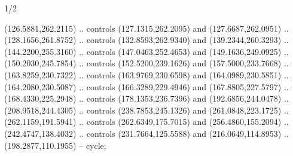\begin{flagdescription}{1/2}
\begin{scope}[y=-\flagwidth/600, x=\flagwidth/600,shift={(0,-600)}]
\begin{scope}[cm={{0.79146,0.0,0.0,0.78939,(-6.93659,3.01275)}}]
  (126.5881,262.2115) .. controls (127.1315,262.2095) and (127.6687,262.0951) ..
  (128.1656,261.8752) .. controls (132.8593,262.9340) and (139.2344,260.3293) ..
  (144.2200,255.3160) .. controls (147.0463,252.4653) and (149.1636,249.0925) ..
  (150.2030,245.7854) .. controls (152.5200,239.1626) and (157.5000,233.7668) ..
  (163.8259,230.7322) .. controls (163.9769,230.6598) and (164.0989,230.5851) ..
  (164.2080,230.5087) .. controls (166.3289,229.4946) and (167.8805,227.5797) ..
  (168.4330,225.2948) .. controls (178.1353,236.7396) and (192.6856,244.0478) ..
  (208.9518,244.4305) .. controls (238.7853,245.1326) and (261.0848,223.1725) ..
  (262.1159,191.5941) .. controls (262.6349,175.7015) and (256.4860,155.2094) ..
  (242.4747,138.4032) .. controls (231.7664,125.5588) and (216.0649,114.8953) ..
  (198.2877,110.1955) -- cycle;
\end{scope}
\end{scope}
\framecode{}
\end{flagdescription}
